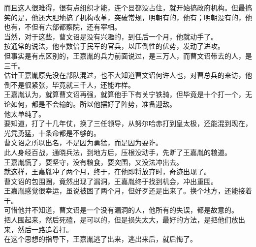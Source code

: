 \begin{multicols}{\theparacolNo}
而且这人很难得，很有点组织才能，连个县都没占住，就开始搞政府机构。但最搞笑的是，他还大胆地搞了机构改革，突破常规，明朝有的，他有；明朝没有的，他也有，不但有六部都察院，还有宰相。\\

当然，对于这些，曹文诏是没有兴趣的，到任后一个月，他就动手了。\\

按通常的说法，他率数倍于民军的官兵，以压倒性的优势，发动了进攻。\\

但事实是有点区别的，王嘉胤的兵力前面说过，是三万人，而曹文诏带去的人，是三千。\\

估计王嘉胤原先没在部队混过，也不大知道曹文诏何许人也，对曹总兵的来访，他倒不是很紧张，毕竟就三千人，还能咋样。\\

王嘉胤认为，就算曹文诏再强，就算他手下有关宁铁骑，但毕竟是十个打一个，无论如何，都是不会输的。所以他摆好了阵势，准备迎敌。\\

他太单纯了。\\

要知道，打了十几年仗，换了三任领导，从努尔哈赤打到皇太极，还能混到现在，光凭勇猛，十条命都是不够的。\\

曹文诏之所以出名，不是因为勇猛，而是因为耍诈。\\

此人身经百战，通晓兵法，到地方后，压根没动手，先断了王嘉胤的粮道。\\

王嘉胤慌了，要坚守，没有粮食，要突围，又没法冲出去。\\

就这样，王嘉胤冲了两个月，终于，在他即将放弃时，奇迹出现了。\\

曹文诏的包围圈，竟然出现了漏洞，王嘉胤终于找到机会，冲出重围。\\

王嘉胤感觉很幸运，虽说被困了两个月，但好歹还是出来了。换个地方，还能接着干。\\

可惜他并不知道，曹文诏是一个没有漏洞的人，他所有的失误，都是故意的。\\

把人围起来，然后死磕，是可以的，但是损失太大，最好的方法，是把他们放出来，然后一路追着打。\\

在这个思想的指导下，王嘉胤逃了出来，逃出来后，就后悔了。\\


\end{multicols}
